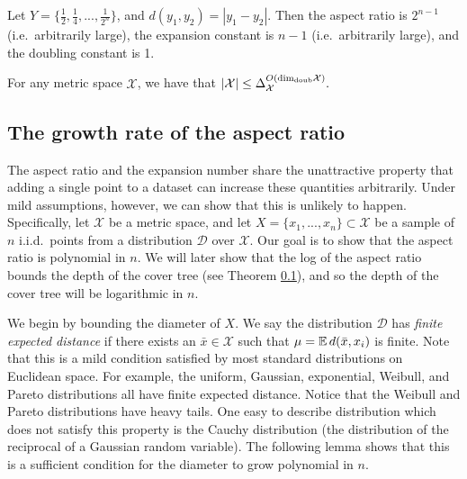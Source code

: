 \documentclass[../main.tex]{subfiles}
\newcommand{\set}[1]{\mathcal {#1}}
\newcommand{\distribution}[1]{\mathcal {#1}}
\newcommand{\dist}[2]{\distf({#1},{#2})}
\newcommand{\distf}{d}
\newcommand{\aspect}[1]{\Delta_{#1}}
\newcommand{\doubdim}{\text{dim}_\textnormal{doub}}
\begin{document}
\begin{example}
    Let $Y=\{\frac 1 2, \frac 1 4, ..., \frac 1 {2^n}\}$,
    and $\dist{y_1}{y_2}=|y_1-y_2|$.
    Then the aspect ratio is $2^{n-1}$ (i.e.\ arbitrarily large),
    the expansion constant is $n-1$ (i.e.\ arbitrarily large),
    and the doubling constant is 1.
\end{example}

\begin{lemma}
    For any metric space $\set X$, we have that
    $
        |\set X| \le \aspect{\set X}^{O(\doubdim{\set X})}.
    $
\end{lemma}


\subsection{The growth rate of the aspect ratio}

The aspect ratio and the expansion number share the unattractive property that adding a single point to a dataset can increase these quantities arbitrarily.
Under mild assumptions, however, we can show that this is unlikely to happen.
Specifically, let $\set X$ be a metric space, 
and let $X=\{x_1,...,x_n\}\subset\set X$ be a sample of $n$ i.i.d.\ points from a distribution $\distribution D$ over $\set X$.
Our goal is to show that the aspect ratio is polynomial in $n$.
We will later show that the log of the aspect ratio bounds the depth of the cover tree (see Theorem \ref{}),
and so the depth of the cover tree will be logarithmic in $n$.

We begin by bounding the diameter of $X$.
We say the distribution $\distribution D$ has \emph{finite expected distance} if there exists an $\bar x\in\set X$ such that $\mu=\E\dist{\bar x}{x_i}$ is finite.
Note that this is a mild condition satisfied by most standard distributions on Euclidean space.
For example, the uniform, Gaussian, exponential, Weibull, and Pareto distributions all have finite expected distance.
Notice that the Weibull and Pareto distributions have heavy tails.
One easy to describe distribution which does not satisfy this property is the Cauchy distribution 
(the distribution of the reciprocal of a Gaussian random variable).
The following lemma shows that this is a sufficient condition for the diameter to grow polynomial in $n$.
\end{document}
